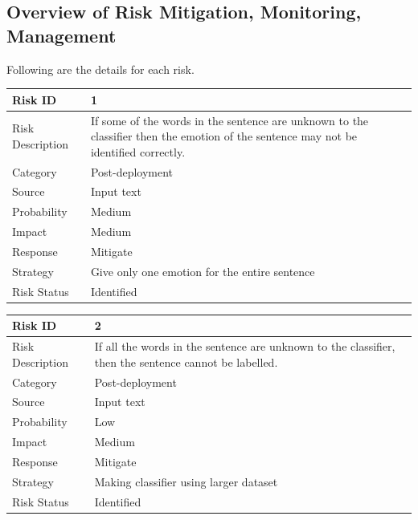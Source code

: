 \documentclass[oneside,a4paper,12pt]{book}
\begin{document}
\subsection{Overview of Risk Mitigation, Monitoring, Management}


Following are the details for each risk.
\begin{table}[!htbp]
	\begin{center}
		\def\arraystretch{1.5}
		\begin{tabularx}{\textwidth}{| l | X |}
			\hline 
			Risk ID	& 1 \\ \hline
			Risk Description	& If some of the words in the sentence are unknown to the classifier then the emotion of the sentence may not be identified correctly. \\ \hline
			Category	& Post-deployment \\ \hline
			Source	& Input text \\ \hline
			Probability	& Medium \\ \hline
			Impact	& Medium \\ \hline
			Response	& Mitigate \\ \hline
			Strategy	& Give only one emotion for the entire sentence \\ \hline
			Risk Status	&  Identified\\ \hline
		\end{tabularx}
	\end{center}
	\label{tab:risk1}
\end{table}

\begin{table}[!htbp]
	\begin{center}
		\def\arraystretch{1.5}
		\begin{tabularx}{\textwidth}{| l | X |}
			\hline 
			Risk ID	& 2 \\ \hline
			Risk Description	& If all the words in the sentence are unknown to the classifier, then the sentence cannot be labelled. \\ \hline
			Category	& Post-deployment \\ \hline
			Source	& Input text \\ \hline
			Probability	& Low \\ \hline
			Impact	& Medium \\ \hline
			Response	& Mitigate \\ \hline
			Strategy	& Making classifier using larger dataset  \\ \hline
			Risk Status	& Identified \\ \hline
		\end{tabularx}
	\end{center}
	\label{tab:risk2}
\end{table}
\end{document}
